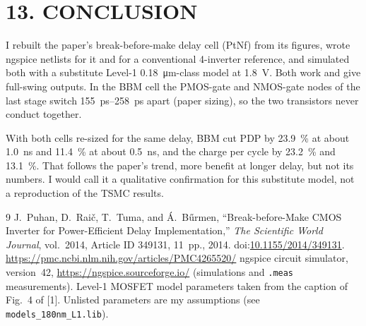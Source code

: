 \documentclass[11pt,a4paper]{article}
\newcommand{\sect}[1]{\section*{#1}}
\begin{document}
\sect{13. CONCLUSION}
I rebuilt the paper's break-before-make delay cell (PtNf) from its figures, wrote ngspice netlists for it and for a conventional 4-inverter reference, and simulated both with a substitute Level-1 \SI{0.18}{\micro\meter}-class model at \SI{1.8}{\volt}. Both work and give full-swing outputs. In the BBM cell the PMOS-gate and NMOS-gate nodes of the last stage switch \SIrange{155}{258}{\pico\second} apart (paper sizing), so the two transistors never conduct together.

With both cells re-sized for the same delay, BBM cut PDP by \SI{23.9}{\percent} at about \SI{1.0}{\nano\second} and \SI{11.4}{\percent} at about \SI{0.5}{\nano\second}, and the charge per cycle by \SI{23.2}{\percent} and \SI{13.1}{\percent}. That follows the paper's trend, more benefit at longer delay, but not its numbers. I would call it a qualitative confirmation for this substitute model, not a reproduction of the TSMC results.

\renewcommand{\refname}{14. REFERENCES}
\begin{thebibliography}{9}
   J.~Puhan, D.~Rai\v{c}, T.~Tuma, and \'A.~B\H{u}rmen, ``Break-before-Make CMOS Inverter for Power-Efficient Delay Implementation,'' \emph{The Scientific World Journal}, vol.~2014, Article ID 349131, 11~pp., 2014. doi:\href{https://doi.org/10.1155/2014/349131}{10.1155/2014/349131}. \url{https://pmc.ncbi.nlm.nih.gov/articles/PMC4265520/}
   ngspice circuit simulator, version~42, \url{https://ngspice.sourceforge.io/} (simulations and \texttt{.meas} measurements).
   Level-1 MOSFET model parameters taken from the caption of Fig.~4 of [1]. Unlisted parameters are my assumptions (see \texttt{models\_180nm\_L1.lib}).
\end{thebibliography}
\end{document}
